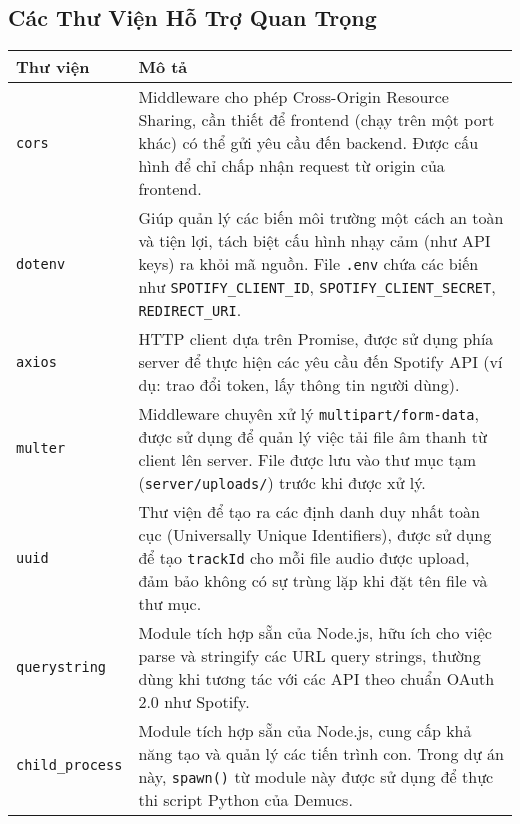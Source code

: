 \documentclass[12pt,a4paper]{article}
\begin{document}
\subsection{Các Thư Viện Hỗ Trợ Quan Trọng}
\label{subsec:supporting-libraries}

\begin{longtable}{|p{3cm}|p{12cm}|}
\hline
\textbf{Thư viện} & \textbf{Mô tả} \\
\hline
\endhead

\texttt{cors} & Middleware cho phép Cross-Origin Resource Sharing, cần thiết để frontend (chạy trên một port khác) có thể gửi yêu cầu đến backend. Được cấu hình để chỉ chấp nhận request từ origin của frontend. \\
\hline

\texttt{dotenv} & Giúp quản lý các biến môi trường một cách an toàn và tiện lợi, tách biệt cấu hình nhạy cảm (như API keys) ra khỏi mã nguồn. File \texttt{.env} chứa các biến như \texttt{SPOTIFY\_CLIENT\_ID}, \texttt{SPOTIFY\_CLIENT\_SECRET}, \texttt{REDIRECT\_URI}. \\
\hline

\texttt{axios} & HTTP client dựa trên Promise, được sử dụng phía server để thực hiện các yêu cầu đến Spotify API (ví dụ: trao đổi token, lấy thông tin người dùng). \\
\hline

\texttt{multer} & Middleware chuyên xử lý \texttt{multipart/form-data}, được sử dụng để quản lý việc tải file âm thanh từ client lên server. File được lưu vào thư mục tạm (\texttt{server/uploads/}) trước khi được xử lý. \\
\hline

\texttt{uuid} & Thư viện để tạo ra các định danh duy nhất toàn cục (Universally Unique Identifiers), được sử dụng để tạo \texttt{trackId} cho mỗi file audio được upload, đảm bảo không có sự trùng lặp khi đặt tên file và thư mục. \\
\hline

\texttt{querystring} & Module tích hợp sẵn của Node.js, hữu ích cho việc parse và stringify các URL query strings, thường dùng khi tương tác với các API theo chuẩn OAuth 2.0 như Spotify. \\
\hline

\texttt{child\_process} & Module tích hợp sẵn của Node.js, cung cấp khả năng tạo và quản lý các tiến trình con. Trong dự án này, \texttt{spawn()} từ module này được sử dụng để thực thi script Python của Demucs. \\
\hline
\end{longtable}
\end{document}
